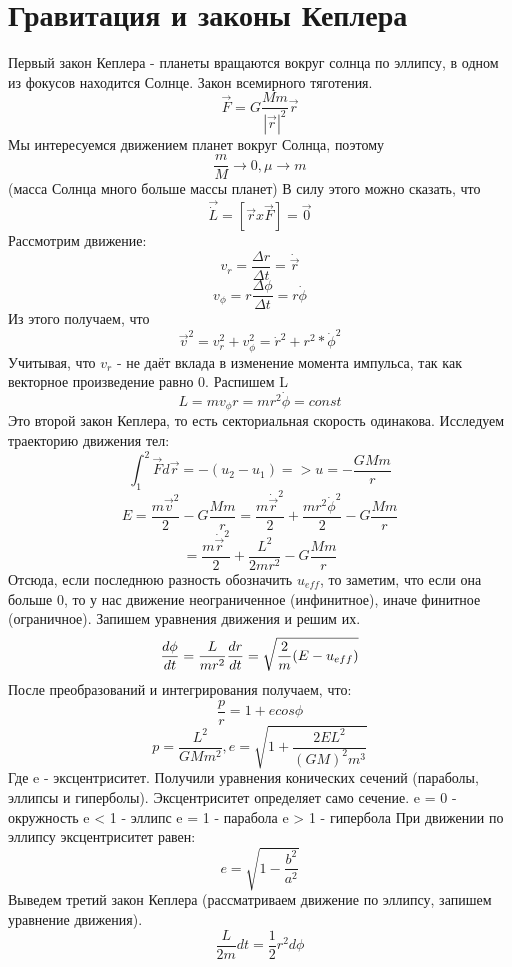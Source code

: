 \section{Гравитация и законы Кеплера}
Первый закон Кеплера - планеты вращаются вокруг солнца по эллипсу, в одном из фокусов находится Солнце.
\newline Закон всемирного тяготения.
\[\Vec{F} = G\frac{Mm}{|\Vec{r}|^2}\Vec{r}\]
Мы интересуемся движением планет вокруг Солнца, поэтому
\[\frac{m}{M} \rightarrow 0, \mu \rightarrow m\]
(масса Солнца много больше массы планет)
\newline
В силу этого можно сказать, что
\[\Vec{\dot L} = [\Vec{r} x \Vec{F}] = \Vec{0}\]
Рассмотрим движение:
\[v_r = \frac{\Delta r}{\Delta t} = \dot \Vec{r}\]
\[v_{\phi} = r \frac{\Delta \phi}{\Delta t} = r \dot \phi\]
Из этого получаем, что
\[\Vec{v}^2 = v_r^2 + v_{\phi}^2 = \dot r^2 + r^2 * \dot \phi^2\]
Учитывая, что $v_r$ - не даёт вклада в изменение момента импульса, так как векторное произведение равно 0.
Распишем L
\[L = mv_{\phi}r = mr^2\dot \phi = const\]
Это второй закон Кеплера, то есть секториальная скорость одинакова.
\newline Исследуем траекторию движения тел:
\[\int_1^2 \Vec{F}d\Vec{r} = -(u_2 - u_1) => u = -\frac{GMm}{r}\]
\[E = \frac{m\Vec{v}^2}{2} - G\frac{Mm}{r} = \frac{m\dot \Vec{r}^2}{2} + \frac{mr^2\dot \phi^2}{2} - G\frac{Mm}{r}\]
\[= \frac{m\dot \Vec{r}^2}{2} + \frac{L^2}{2mr^2} - G\frac{Mm}{r}\]
Отсюда, если последнюю разность обозначить $u_{eff}$, то заметим, что если она больше 0, то у нас движение неограниченное (инфинитное), иначе финитное (ограничное).
Запишем уравнения движения и решим их.
\begin{equation*}
    \frac{d\phi}{dt} = \frac{L}{mr^2} \\
    \\
    \frac{dr}{dt} = \sqrt{\frac{2}{m}(E - u_{eff})}
\end{equation*}
После преобразований и интегрирования получаем, что:
\[\frac{p}{r} = 1 +ecos\phi\]
\[p = \frac{L^2}{GMm^2}, e = \sqrt{1 + \frac{2EL^2}{(GM)^2m^3}}\]
Где e - эксцентриситет.
\newline Получили уравнения конических сечений (параболы, эллипсы и гиперболы).
Эксцентриситет определяет само сечение.
e = 0 - окружность
e < 1 - эллипс
e = 1 - парабола
e > 1 - гипербола
При движении по эллипсу эксцентриситет равен:
\[e = \sqrt{1 - \frac{b^2}{a^2}}\]
Выведем третий закон Кеплера (рассматриваем движение по эллипсу, запишем уравнение движения).
\[\frac{L}{2m}dt = \frac{1}{2}r^2d\phi\]
